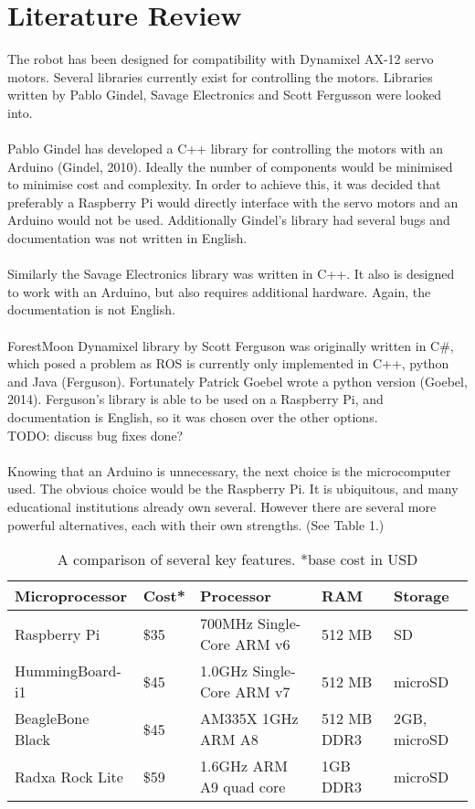 \documentclass[]{article}
\begin{document}
\section{Literature Review}

The robot has been designed for compatibility with Dynamixel AX-12 servo motors. Several libraries currently exist for controlling the motors. Libraries written by Pablo Gindel, Savage Electronics and Scott Fergusson were looked into.
\\
\\
Pablo Gindel has developed a C++ library for controlling the motors with an Arduino (Gindel, 2010). Ideally the number of components would be minimised to minimise cost and complexity. In order to achieve this, it was decided that preferably a Raspberry Pi would directly interface with the servo motors and an Arduino would not be used. Additionally Gindel's library had several bugs and documentation was not written in English.
\\
\\
Similarly the Savage Electronics library was written in C++. It also is designed to work with an Arduino, but also requires additional hardware. Again, the documentation is not English.
\\
\\
ForestMoon Dynamixel library by Scott Ferguson was originally written in C\#, which posed a problem as ROS is currently only implemented in C++, python and Java (Ferguson). Fortunately Patrick Goebel wrote a python version (Goebel, 2014). Ferguson's library is able to be used on a Raspberry Pi, and documentation is English, so it was chosen over the other options.
\\
TODO: discuss bug fixes done?
\\
\\
Knowing that an Arduino is unnecessary, the next choice is the microcomputer used. The obvious choice would be the Raspberry Pi. It is ubiquitous, and many educational institutions already own several. However there are several more powerful alternatives, each with their own strengths. (See Table 1.)
\\


\begin{table}[h]
\centering
\begin{tabular}[c]{l l p{2.5cm} l p{1.7cm}}
Microprocessor   & Cost* & Processor                             & RAM             & Storage                    \\
\hline
Raspberry Pi     & \$35      & 700MHz Single-Core ARM v6             & 512 MB      & SD                         \\
HummingBoard-i1  & \$45      & 1.0GHz Single-Core ARM v7             & 512 MB      &             microSD               \\
BeagleBone Black & \$45      & AM335X 1GHz ARM A8             & 512 MB DDR3 & 2GB, microSD \\
Radxa Rock Lite  & \$59      & 1.6GHz  ARM A9 quad core & 1GB DDR3           & microSD                   
\end{tabular}
\caption{A comparison of several key features. *base cost in USD}
\end{table}
\end{document}
